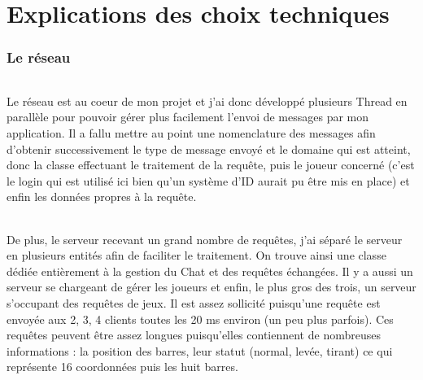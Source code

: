 \documentclass[a4paper,12pt]{report}
\begin{document}
\part{Explications des choix techniques}
\section{Le réseau}
\paragraph{}
Le réseau est au coeur de mon projet et j'ai donc développé plusieurs Thread en parallèle pour pouvoir gérer plus facilement l'envoi de messages par mon application.
Il a fallu mettre au point une nomenclature des messages afin d'obtenir successivement le type de message envoyé et le domaine qui est atteint, donc la classe effectuant le traitement de la requête, puis le joueur concerné (c'est le login qui est utilisé ici bien qu'un système d'ID aurait pu être mis en place) et enfin les données propres à la requête.
\paragraph{}
De plus, le serveur recevant un grand nombre de requêtes, j'ai séparé le serveur en plusieurs entités afin de faciliter le traitement. On trouve ainsi une classe dédiée entièrement à la gestion du Chat et des requêtes échangées. Il y a aussi un serveur se chargeant de gérer les joueurs et enfin, le plus gros des trois, un serveur s'occupant des requêtes de jeux. Il est assez sollicité puisqu'une requête est envoyée aux 2, 3, 4 clients toutes les 20 ms environ (un peu plus parfois). Ces requêtes peuvent être assez longues puisqu'elles contiennent de nombreuses informations : la position des barres, leur statut (normal, levée, tirant) ce qui représente 16 coordonnées puis les huit barres.
\end{document}

